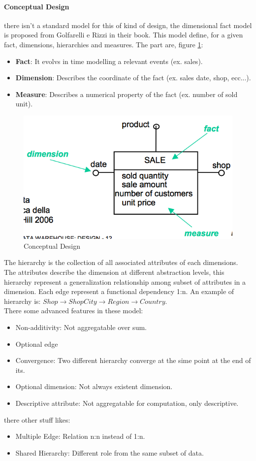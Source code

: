 \documentclass[12pt]{article}
\begin{document}
\paragraph{Conceptual Design} there isn't a standard model for this of kind of design, the dimensional fact model is proposed from Golfarelli e Rizzi in their book. This model define, for a given fact, dimensions, hierarchies and measures. The part are, figure \ref{fig:conce}:
\begin{itemize}
  \item \textbf{Fact}: It evolvs in time modelling a relevant events (ex. sales).
  \item \textbf{Dimension}: Describes the coordinate of the fact (ex. sales date, shop, ecc...).
  \item \textbf{Measure}: Describes a numerical property of the fact (ex. number of sold unit).
\end{itemize}
\begin{figure}[h!]
  \includegraphics[width=\linewidth]{images/conce.png}
  \caption{Conceptual Design}
  \label{fig:conce}
\end{figure}
The hierarchy is the collection of all associated attributes of each dimensions. The attributes describe the dimension at different abstraction levels, this hierarchy represent a generalization relationship among subset of attributes in a dimension. Each edge represent a functional dependency 1:n. An example of hierarchy is: $Shop \rightarrow ShopCity \rightarrow Region \rightarrow Country$.\\
There some advanced features in these model:
\begin{itemize}
  \item Non-additivity: Not aggregatable over sum.
  \item Optional edge
  \item Convergence: Two different hierarchy converge at the sime point at the end of its.
  \item Optional dimension: Not always existent dimension.
  \item Descriptive attribute: Not aggregatable for computation, only descriptive.
\end{itemize}
there other stuff likes:
\begin{itemize}
  \item Multiple Edge: Relation n:n instead of 1:n.
  \item Shared Hierarchy: Different role from the same subset of data.
\end{itemize}
\end{document}
